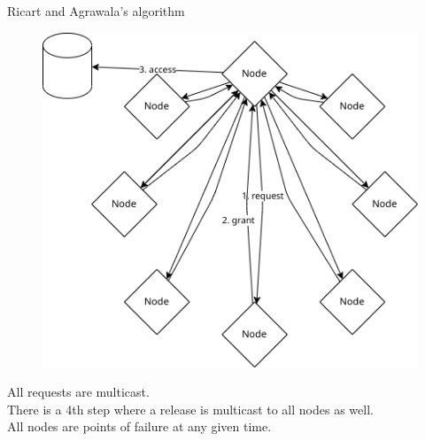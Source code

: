 \documentclass[aspectratio=1610,17pt,utf8]{beamer}
\begin{document}
\begin{frame}{Ricart and Agrawala's algorithm}
    \begin{minipage}{.45\textwidth}
        \begin{figure}
            \includegraphics[width=\textwidth]{figures/1-ricart-agrawala.png}
        \end{figure}
    \end{minipage}
    \begin{minipage}{.5\textwidth}
        \tiny{All requests are multicast.\\There is a 4th step where a release is multicast to all nodes as well.\\All nodes are points of failure at any given time.}
    \end{minipage}
\end{frame}
\end{document}
